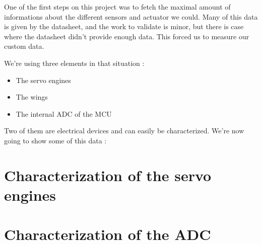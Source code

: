 One of the first steps on this project was to fetch the maximal amount of
informations about the different sensors and actuator we could. Many of this
data is given by the datasheet, and the work to validate is minor, but there is
case where the datasheet didn't provide enough data. This forced us to measure
our custom data.

We're using three elements in that situation :
\begin{itemize}[noitemsep]
    \item The servo engines
    \item The wings
    \item The internal ADC of the MCU
\end{itemize}

Two of them are electrical devices and can easily be characterized. We're now
going to show some of this data :

\section{Characterization of the servo engines}


\section{Characterization of the ADC}


% 

